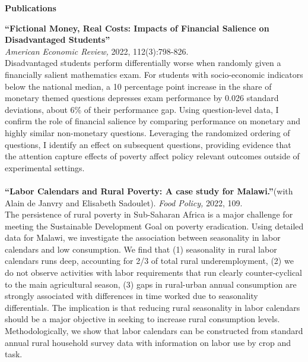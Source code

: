 \documentclass[10pt, oneside]{article}
\begin{document}
\begin{minipage}[t]{0.1\linewidth}
\textbf{Publications}
\end{minipage}\hspace{0.05\linewidth}
\begin{minipage}[t]{0.8\linewidth}

\textbf{``Fictional Money, Real Costs: Impacts of Financial Salience on Disadvantaged Students''}\\ \emph{ American Economic Review,} 2022, 112(3):798-826. \href{http://claireduq.github.io/FMRC_Duquennois.pdf}{\color{blue}{Available here}}\\
Disadvantaged students perform differentially worse when randomly given a financially salient mathematics exam. For students with socio-economic indicators below the national median, a 10 percentage point increase in the share of monetary themed questions depresses exam performance by 0.026 standard deviations, about 6\% of their performance gap. Using question-level data, I confirm the role of financial salience by comparing performance on monetary and highly similar non-monetary questions. Leveraging the randomized ordering of questions, I identify an effect on subsequent questions, providing evidence that the attention capture effects of poverty affect policy relevant outcomes outside of experimental settings. \\~\\

\textbf{``Labor Calendars and Rural Poverty: A case study for Malawi.''}(with Alain de Janvry and Elisabeth Sadoulet). \emph{Food Policy,} 2022, 109. \href{http://claireduq.github.io/laborcal_FP_revision_adj.pdf}{\color{blue}{Available here}}\\
The persistence of rural poverty in Sub-Saharan Africa is a major challenge for meeting the Sustainable Development Goal on poverty eradication. Using detailed data for Malawi, we investigate the association between seasonality in labor calendars and low consumption. We find that (1) seasonality in rural labor calendars runs deep, accounting for 2/3 of total rural underemployment, (2) we do not observe activities with labor requirements that run clearly counter-cyclical to the main agricultural season, (3) gaps in rural-urban annual consumption are strongly associated with differences in time worked due to seasonality differentials. The implication is that reducing rural seasonality in labor calendars should be a major objective in seeking to increase rural consumption levels. Methodologically, we show that labor calendars can be constructed from standard annual rural household survey data with information on labor use by crop and task.\\~\\


\end{minipage}
\end{document}
